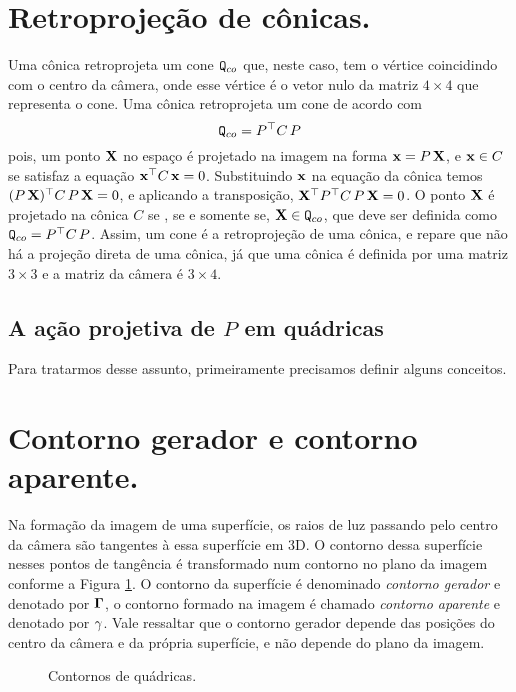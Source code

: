 \section*{Retroprojeção de cônicas.}
Uma cônica retroprojeta um cone ${\tt Q}_{co}$ que, neste caso, tem o vértice coincidindo com o centro da câmera, onde esse vértice é o vetor nulo da matriz $4\times4$ que representa o cone. Uma cônica retroprojeta um cone de acordo com 
\begin{equation*}
{\tt Q}_{co}=P^\top C\,P
\end{equation*}
pois, um ponto $\mathbf{X}$ no espaço é projetado na imagem na forma $\mathbf{x}=P\,\mathbf{X}$, e $\mathbf{x}\in C$ se satisfaz a equação $\mathbf{x}^\top C\,\mathbf{x}=0$. Substituindo $\mathbf{x}$ na equação da cônica temos $(P\,\mathbf{X})^\top C\,P\,\mathbf{X}=0$, e aplicando a transposição, $\mathbf{X}^\top P^\top C\,P\,\mathbf{X}=0$. O ponto $\mathbf{X}$ é projetado na cônica $C$ se , se e somente se, $\mathbf{X}\in {\tt Q}_{co}$, que deve ser definida como ${\tt Q}_{co}=P^\top C\,P$. Assim, um cone é a retroprojeção de uma cônica, e repare que não há a projeção direta de uma cônica, já que uma cônica é definida por uma matriz $3\times3$ e a matriz da câmera é $3\times4$.
\subsection{A ação projetiva de $P$ em quádricas}\label{sec.proj-quadricas}
Para tratarmos desse assunto, primeiramente precisamos definir alguns conceitos.
\section*{Contorno gerador e contorno aparente.}
Na formação da imagem de uma superfície, os raios de luz passando pelo centro da câmera são tangentes à essa superfície em 3D. O contorno dessa superfície nesses pontos de tangência é transformado num contorno no plano da imagem conforme a Figura \ref{fig.cont-gerador-aparente}. O contorno da superfície é denominado \textit{contorno gerador} e denotado por ${\bf \Gamma}$, o contorno formado na imagem é chamado \textit{contorno aparente} e denotado por ${\bf \gamma}$. Vale ressaltar que o contorno gerador depende das posições do centro da câmera e da própria superfície, e não depende do plano da imagem.
\begin{figure}[htb!]{\textwidth}
\caption{Contornos de qu\'adricas.}
\hfill
{}\hfill
{}
\label{fig.cont-gerador-aparente}
\end{figure}

